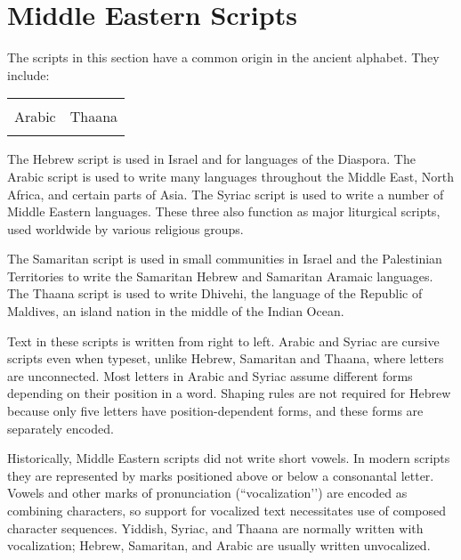 \chapter{Middle Eastern Scripts}
\label{ch:middleeasternscripts}

The scripts in this section have a common origin in the ancient  alphabet. They include:

\begin{center}
\begin{tabular}{ll}
\nameref{hebrew} & \nameref{s:samaritan}\\
Arabic & Thaana\\
\nameref{s:syriac} &\\
\end{tabular}
\end{center}

The Hebrew script is used in Israel and for languages of the Diaspora. The Arabic script is
used to write many languages throughout the Middle East, North Africa, and certain parts
of Asia. The Syriac script is used to write a number of Middle Eastern languages. These
three also function as major liturgical scripts, used worldwide by various religious groups.

The Samaritan script is used in small communities in Israel and the Palestinian Territories
to write the Samaritan Hebrew and Samaritan Aramaic languages. The Thaana script is
used to write Dhivehi, the language of the Republic of Maldives, an island nation in the
middle of the Indian Ocean. 

Text in these scripts is written from right to left. Arabic and Syriac are cursive scripts even when typeset, unlike Hebrew, Samaritan  and Thaana, where letters are unconnected. Most letters in Arabic and Syriac assume different forms depending on their position in a word. Shaping rules are not required for Hebrew because only five letters have position-dependent forms, and these forms are separately encoded.

Historically, Middle Eastern  scripts did not write short vowels. In modern scripts they are represented  by marks positioned above or below a consonantal letter. Vowels and other
marks of pronunciation (``vocalization’’) are encoded as combining characters, so support
for vocalized text necessitates use of composed character sequences. Yiddish, Syriac, and
Thaana are normally written with vocalization; Hebrew, Samaritan, and Arabic are usually written unvocalized. 















\endinput










